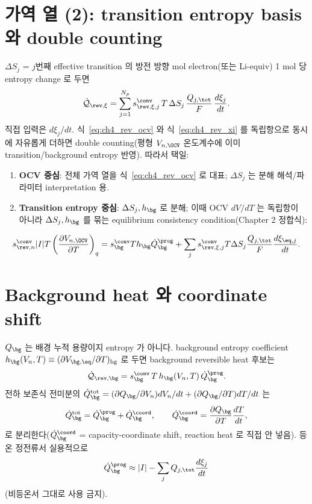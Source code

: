 \section{가역 열 (2): transition entropy basis 와 double counting}\label{sec:ch4_revxi}
$\Delta S_j$ = $j$번째 effective transition 의 방전 방향 mol electron(또는 Li-equiv) 1 mol 당 entropy
change 로 두면
\begin{equation}
\dot{\mathcal Q}_{\rev,\xi}=\sum_{j=1}^{N_p}s_{\rev,\xi,j}^{\conv}\,T\,\Delta S_j\,\frac{Q_{j,\tot}}{F}\,\frac{d\xi_j}{dt}.
\label{eq:ch4_rev_xi}
\end{equation}
직접 입력은 $d\xi_j/dt$. 식~\eqref{eq:ch4_rev_ocv} 와 식~\eqref{eq:ch4_rev_xi} 를 독립항으로 동시에 자유롭게
더하면 double counting(평형 $V_{n,\OCV}$ 온도계수에 이미 transition/background entropy 반영). 따라서 택일:
\begin{enumerate}[label=\Alph*),leftmargin=2.0em]
\item \textbf{OCV 중심}: 전체 가역 열을 식~\eqref{eq:ch4_rev_ocv} 로 대표; $\Delta S_j$ 는 분해 해석/파라미터
  interpretation 용.
\item \textbf{Transition entropy 중심}: $\Delta S_j, h_\bg$ 로 분해; 이때 OCV $dV/dT$ 는 독립항이 아니라
  $\Delta S_j,h_\bg$ 를 묶는 equilibrium consistency condition(Chapter 2 정합식):
\end{enumerate}
\begin{equation}
s_{\rev,n}^{\conv}|I|T\left(\frac{\partial V_{n,\OCV}}{\partial T}\right)_q
=s_\bg^{\conv}Th_\bg\dot Q_\bg^{\prog}+\sum_j s_{\rev,\xi,j}^{\conv}T\Delta S_j\frac{Q_{j,\tot}}{F}\frac{d\xi_{\eq,j}}{dt}.
\label{eq:ch4_consistency}
\end{equation}

\section{Background heat 와 coordinate shift}\label{sec:ch4_bg}
$Q_\bg$ 는 배경 누적 용량이지 entropy 가 아니다. background entropy coefficient
$h_\bg(V_n,T)\equiv(\partial V_{\bg,\eq}/\partial T)_{\mathrm{bg}}$ 로 두면 background reversible heat 후보는
\begin{equation}
\dot{\mathcal Q}_{\rev,\bg}=s_\bg^{\conv}\,T\,h_\bg(V_n,T)\,\dot Q_\bg^{\prog}.
\label{eq:ch4_qrev_bg}
\end{equation}
전하 보존식 전미분의 $\dot Q_\bg^{\mathrm{tot}}=(\partial Q_\bg/\partial V_n)dV_n/dt+(\partial Q_\bg/\partial T)dT/dt$ 는
\begin{equation}
\dot Q_\bg^{\mathrm{tot}}=\dot Q_\bg^{\prog}+\dot Q_\bg^{\coord},\qquad
\dot Q_\bg^{\coord}=\frac{\partial Q_\bg}{\partial T}\frac{dT}{dt},
\label{eq:ch4_qbg_split}
\end{equation}
로 분리한다($\dot Q_\bg^{\coord}$ = capacity-coordinate shift, reaction heat 로 직접 안 넣음). 등온 정전류서
실용적으로
\begin{equation}
\dot Q_\bg^{\prog}\approx|I|-\sum_jQ_{j,\tot}\frac{d\xi_j}{dt}
\label{eq:ch4_qbg_iso}
\end{equation}
(비등온서 그대로 사용 금지).

